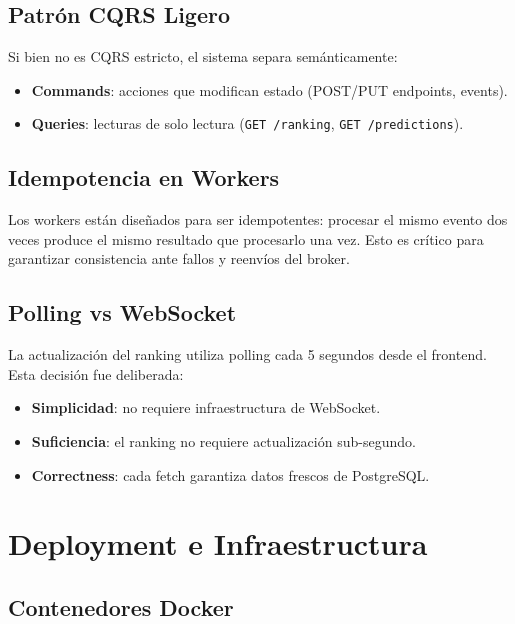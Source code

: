 \documentclass[12pt,a4paper]{article}
\newcommand{\code}[1]{\texttt{\small\color{navy}#1}}
\begin{document}
\subsection{Patrón CQRS Ligero}

Si bien no es CQRS estricto, el sistema separa semánticamente:
\begin{itemize}
  \item \textbf{Commands}: acciones que modifican estado (POST/PUT endpoints, events).
  \item \textbf{Queries}: lecturas de solo lectura (\code{GET /ranking}, \code{GET /predictions}).
\end{itemize}

\subsection{Idempotencia en Workers}

Los workers están diseñados para ser idempotentes: procesar el mismo evento dos veces
produce el mismo resultado que procesarlo una vez. Esto es crítico para garantizar
consistencia ante fallos y reenvíos del broker.

\subsection{Polling vs WebSocket}

La actualización del ranking utiliza polling cada 5 segundos desde el frontend.
Esta decisión fue deliberada:
\begin{itemize}
  \item \textbf{Simplicidad}: no requiere infraestructura de WebSocket.
  \item \textbf{Suficiencia}: el ranking no requiere actualización sub-segundo.
  \item \textbf{Correctness}: cada fetch garantiza datos frescos de PostgreSQL.
\end{itemize}

\section{Deployment e Infraestructura}

\subsection{Contenedores Docker}
\end{document}
